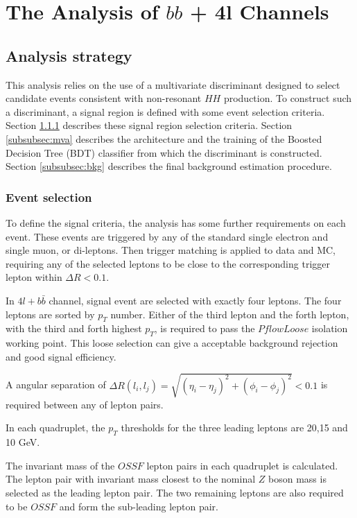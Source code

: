 \section{The Analysis of $bb$ + 4l Channels }
\label{sec:bb4l}

\subsection{Analysis strategy}
\label{subsec:ana}

This analysis relies on the use of a multivariate discriminant designed to select candidate events consistent with non-resonant $HH$ production. To construct such a discriminant, a signal region is defined with some event selection criteria. Section \ref{subsubsec:pre-selection} describes these signal region selection criteria. Section \ref{subsubsec:mva} describes the architecture and the training of the Boosted Decision Tree (BDT) classifier from which the discriminant is constructed. Section \ref{subsubsec:bkg} describes the final background estimation procedure.

\subsubsection{Event selection}
\label{subsubsec:pre-selection}

To define the signal criteria, the analysis has some further requirements on each event. These events are triggered by any of the standard single electron and single muon, or di-leptons. Then trigger matching is applied to data and MC, requiring any of the selected leptons to be close to the corresponding trigger lepton within $\Delta{R}<0.1$.

In $4l+b\bar{b}$ channel, signal event are selected with exactly four leptons. The four leptons are sorted by $p_{T}$ number. Either of the third lepton and the forth lepton, with the third and forth highest $p_{T}$, is required to pass the $PflowLoose$ isolation working point. This loose selection can give a acceptable background rejection and good signal efficiency.

A angular separation of $\Delta{R}(l_{i},l_{j})=\sqrt{(\eta_{i}-\eta_{j})^{2}+(\phi_{i}-\phi_{j})^{2}}<0.1$ is required between any of lepton pairs.

In each quadruplet, the $p_{T}$ thresholds for the three leading leptons are 20,15 and 10 GeV.

The invariant mass of the $OSSF$ lepton pairs in each quadruplet is calculated. The lepton pair with invariant mass closest to the nominal $Z$ boson mass is selected as the leading lepton pair. The two remaining leptons are also required to be $OSSF$ and form the sub-leading lepton pair.

